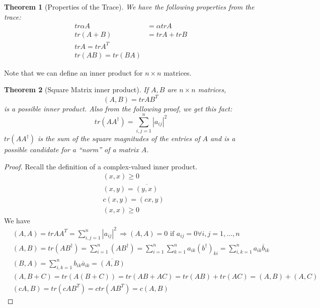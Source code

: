 \documentclass[twoside]{amsart}
\theoremstyle{plain}
\newtheorem{theorem}{Theorem}
\theoremstyle{definition}
\begin{document}
\begin{theorem}[Properties of the Trace]\label{T:Trace_properties} 
We have the following properties from the trace:
\begin{align}
  tr \alpha A & = \alpha tr A  \\
  tr(A+B) & = tr A + tr B   \\
  tr A = tr A^T  \\
  tr(AB) = tr(BA)
\end{align}
\end{theorem}

Note that we can define an inner product for $n \times n$ matrices.  
\begin{theorem}[Square Matrix inner product]\label{T:Square_Matrix_inner_product}
  If $A,B$ are $n\times n$ matrices, 
  \begin{equation}
    (A,B) = tr AB^T
  \end{equation}
is a possible inner product. Also from the following proof, we get this fact:
\begin{equation}
  tr( A A^{\dag}) = \sum_{i,j=1}^n |a_{ij}|^2 
\end{equation}
$tr(AA^{\dag})$ is the sum of the square magnitudes of the entries of $A$ and is a possible candidate for a ``norm'' of a matrix $A$.  
\end{theorem}

\begin{proof}
  Recall the definition of a complex-valued inner product.  
\[
\begin{aligned}
  & (x,x) \geq 0  \\
  & (x,y) = \overline{ (y,x) }  \\
  & c(x,y) = (cx,y)  \\
  & (x,x) \geq 0
\end{aligned}
\]
We have
\[
\begin{aligned}
  & (A,A) = tr A A^T = \sum_{i,j=1}^n |a_{ij}|^2 \, \Longrightarrow (A,A) = 0 \text{ if } a_{ij} = 0 \forall i, j = 1,\dots, n  \\
  & (A,B) = tr (AB^{\dag}) = \sum_{i=1}^n (AB^{\dag}) = \sum_{i=1}^n \sum_{k=1}^n a_{ik}(b^{\dag})_{ki} = \sum_{i,k=1}^n a_{ik} \overline{ b}_{ik}  \\ 
  & (B,A) = \sum_{i,k=1}^n b_{ik} \overline{a}_{ik}  = \overline{ (A,B) }  \\
  & (A,B+C) = tr(A(B+C)) = tr(AB + AC) = tr(AB)+tr(AC) = (A,B) + (A,C)  \\
  & (cA,B) = tr(cAB^T) = c tr(AB^T) = c (A,B)  
\end{aligned}
\]
\end{proof}
\end{document}
